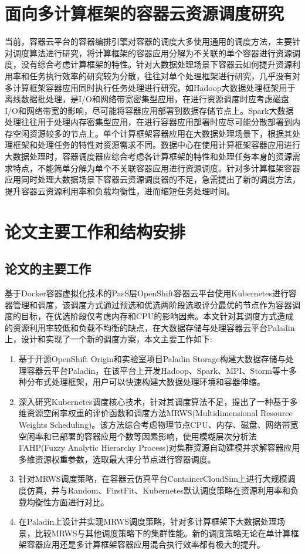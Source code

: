 \section{面向多计算框架的容器云资源调度研究}
当前，容器云平台的容器编排引擎对容器的调度大多使用通用的调度方法，主要针对调度算法进行研究，将计算框架的容器应用分解为不关联的单个容器进行资源调度，没有综合考虑计算框架的特性。针对大数据处理场景下容器云如何提升资源利用率和任务执行效率的研究较为分散，往往对单个处理框架进行研究，几乎没有对多计算框架容器应用同时执行任务处理进行研究。如Hadoop大数据处理框架用于离线数据批处理，是I/O和网络带宽密集型应用，在进行资源调度时应考虑磁盘I/O和网络带宽的影响，尽可能将容器应用部署到数据存储节点上。Spark大数据处理往往用于处理内存密集型应用，在进行容器应用部署时应尽可能分散部署到内存空闲资源较多的节点上。单个计算框架容器应用在大数据处理场景下，根据其处理框架和处理任务的特性对资源需求不同。数据中心在使用计算框架容器应用进行大数据处理时，容器调度器应综合考虑各计算框架的特性和处理任务本身的资源需求特点，不能简单分解为单个不关联容器应用进行资源调度。针对多计算框架容器应用同时处理大数据场景下容器云资源调度器的不足，急需提出了新的调度方法，提升容器云资源利用率和负载均衡性，进而缩短任务处理时间。

\section{论文主要工作和结构安排}
\subsection{论文的主要工作}
基于Docker容器虚拟化技术的PasS层OpenShift容器云平台使用Kubernetes进行容器管理和调度，该调度方式通过预选和优选两阶段选取评分最优的节点作为容器调度的目标，在优选阶段仅考虑内存和CPU的影响因素。本文针对其调度方式造成的资源利用率较低和负载不均衡的缺点，在大数据存储与处理容器云平台Paladin上，设计和实现了一个新的调度方案，本文主要工作如下:
 \begin{enumerate}[(1)]
 \item 基于开源OpenShift Origin和实验室项目Paladin Storage构建大数据存储与处理容器云平台Paladin，在该平台上开发Hadoop、Spark、MPI、Storm等十多种分布式处理框架，用户可以快速构建大数据处理环境和容器伸缩。
\item 深入研究Kubernetes调度核心技术，针对其调度算法不足，提出了一种基于多维资源空闲率权重的评价函数和调度方法MRWS(Multidimensional Resource Weights Scheduling)。该方法综合考虑物理节点CPU、内存、磁盘、网络带宽空闲率和已部署的容器应用个数等因素影响，使用模糊层次分析法FAHP(Fuzzy Analytic Hierarchy Process)对集群资源自动建模并求解容器应用多维资源权重参数，选取最大评分节点进行容器调度。
\item 针对MRWS调度策略，在容器云仿真平台ContainerCloudSim上进行大规模调度仿真，并与Random、FirstFit、Kubernetes默认调度策略在资源利用率和负载均衡性方面进行对比。
\item 在Paladin上设计并实现MRWS调度策略，针对多计算框架下大数据处理场景，比较MRWS与其他调度策略下的集群性能。新的调度策略无论在单计算框架容器应用还是多计算框架容器应用混合执行效率都有极大的提升。
\end{enumerate}

